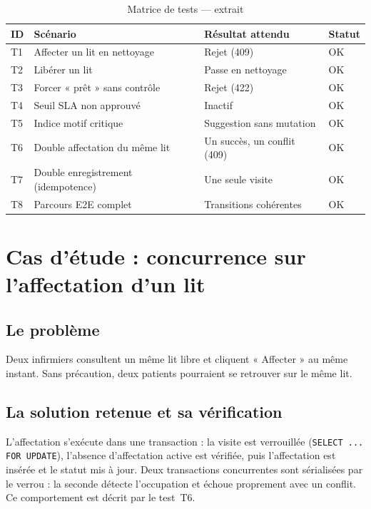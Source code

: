 \begin{table}[H]
\centering
\caption{Matrice de tests — extrait}
\label{tab:tests}
\small
\begin{tabular}{|l|l|l|l|}
\hline
\textbf{ID} & \textbf{Scénario} & \textbf{Résultat attendu} & \textbf{Statut} \\
\hline
T1 & Affecter un lit en nettoyage & Rejet (409) & OK \\
\hline
T2 & Libérer un lit & Passe en nettoyage & OK \\
\hline
T3 & Forcer « prêt » sans contrôle & Rejet (422) & OK \\
\hline
T4 & Seuil SLA non approuvé & Inactif & OK \\
\hline
T5 & Indice motif critique & Suggestion sans mutation & OK \\
\hline
T6 & Double affectation du même lit & Un succès, un conflit (409) & OK \\
\hline
T7 & Double enregistrement (idempotence) & Une seule visite & OK \\
\hline
T8 & Parcours E2E complet & Transitions cohérentes & OK \\
\hline
\end{tabular}
\end{table}

\section{Cas d'étude : concurrence sur l'affectation d'un lit}

\subsection{Le problème}

Deux infirmiers consultent un même lit libre et cliquent « Affecter » au même instant. Sans précaution, deux patients pourraient se retrouver sur le même lit.

\subsection{La solution retenue et sa vérification}

L'affectation s'exécute dans une transaction : la visite est verrouillée (\texttt{SELECT ... FOR UPDATE}), l'absence d'affectation active est vérifiée, puis l'affectation est insérée et le statut mis à jour. Deux transactions concurrentes sont sérialisées par le verrou : la seconde détecte l'occupation et échoue proprement avec un conflit. Ce comportement est décrit par le test~T6.

